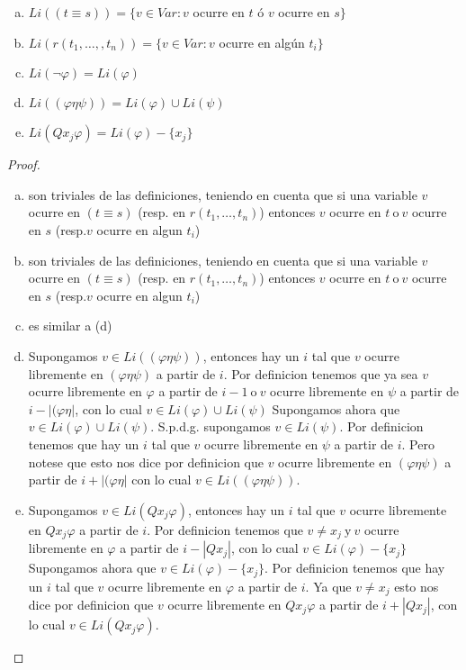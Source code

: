   \begin{lemma} \label{lemma_44}
    \PN \newline
    \begin{enumerate}[(a)]
      \item $Li((t \equiv s)) = \{v \in Var: v$ ocurre en $t$ ó $v$ ocurre en $s\}$
      \item $Li(r(t_{1}, \dotsc, ,t_{n})) = \{v \in Var: v$ ocurre en algún $t_{i}\}$
      \item $Li(\lnot \varphi) = Li(\varphi)$
      \item $Li((\varphi \eta \psi)) = Li(\varphi) \cup Li(\psi)$
      \item $Li(Qx_{j}\varphi) = Li(\varphi)-\{x_{j}\}$
    \end{enumerate}
  \end{lemma}
  \begin{proof}
    \begin{enumerate}[(a)]
      \item son triviales de las definiciones, teniendo en cuenta que si una variable $v$ ocurre en $(t\equiv s)$ (resp. en $r(t_{1}, \dotsc, t_{n})$) entonces $v$ ocurre en $t \ \text{o} \ v$ ocurre en $s$ (resp.$v$ ocurre en algun $ t_{i}$)
      \item son triviales de las definiciones, teniendo en cuenta que si una variable $v$ ocurre en $(t\equiv s)$ (resp. en $r(t_{1}, \dotsc, t_{n})$) entonces $v$ ocurre en $t \ \text{o} \ v$ ocurre en $s$ (resp.$v$ ocurre en algun $ t_{i}$)
      \item es similar a (d)
      \item Supongamos $v\in Li((\varphi \eta \psi ))$, entonces hay un $i$ tal que $ v$ ocurre libremente en $(\varphi \eta \psi )$ a partir de $i$. Por definicion tenemos que ya sea $v$ ocurre libremente en $\varphi $ a partir de $i-1 \ \text{o} \ v$ ocurre libremente en $\psi $ a partir de $i-\left\vert (\varphi \eta \right\vert $, con lo cual $v\in Li(\varphi )\cup Li(\psi )$
      Supongamos ahora que $v\in Li(\varphi )\cup Li(\psi )$. S.p.d.g. supongamos $ v\in Li(\psi )$. Por definicion tenemos que hay un $i$ tal que $v$ ocurre libremente en $\psi $ a partir de $i$. Pero notese que esto nos dice por definicion que $v$ ocurre libremente en $(\varphi \eta \psi )$ a partir de $ i+\left\vert (\varphi \eta \right\vert $ con lo cual $v\in Li((\varphi \eta \psi ))$.
      \item Supongamos $v\in Li(Qx_{j}\varphi )$, entonces hay un $i$ tal que $v$ ocurre libremente en $Qx_{j}\varphi $ a partir de $i$. Por definicion tenemos que $v\neq x_{j} \ \text{y} \ v$ ocurre libremente en $\varphi $ a partir de $ i-\left\vert Qx_{j}\right\vert $, con lo cual $v\in Li(\varphi )-\{x_{j}\}$
      Supongamos ahora que $v\in Li(\varphi )-\{x_{j}\}$. Por definicion tenemos que hay un $i$ tal que $v$ ocurre libremente en $\varphi $ a partir de $i$. Ya que $v\neq x_{j}$ esto nos dice por definicion que $v$ ocurre libremente en $Qx_{j}\varphi $ a partir de $i+\left\vert Qx_{j}\right\vert $, con lo cual $v\in Li(Qx_{j}\varphi )$.
    \end{enumerate}
  \end{proof}

